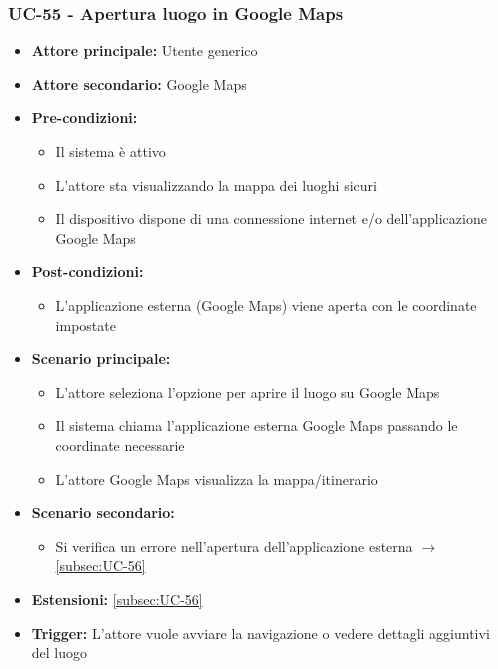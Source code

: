 \documentclass[a4paper,12pt]{article}
\begin{document}
\subsubsection{UC-55 - Apertura luogo in Google Maps} \label{subsec:UC-55}
\begin{itemize}
    \item \textbf{Attore principale:} Utente generico
    \item \textbf{Attore secondario:} Google Maps
    \item \textbf{Pre-condizioni:} 
    \begin{itemize}
        \item Il sistema è attivo
        \item L'attore sta visualizzando la mappa dei luoghi sicuri
        \item Il dispositivo dispone di una connessione internet e/o dell'applicazione Google Maps
    \end{itemize}
    \item \textbf{Post-condizioni:}
    \begin{itemize}
        \item L'applicazione esterna (Google Maps) viene aperta con le coordinate impostate
    \end{itemize}
    \item \textbf{Scenario principale:} 
    \begin{itemize}
        \item L'attore seleziona l'opzione per aprire il luogo su Google Maps
        \item Il sistema chiama l'applicazione esterna Google Maps passando le coordinate necessarie
        \item L'attore Google Maps visualizza la mappa/itinerario
    \end{itemize}
    \item \textbf{Scenario secondario:} 
    \begin{itemize}
         \item Si verifica un errore nell'apertura dell'applicazione esterna $\rightarrow$ \ref{subsec:UC-56}
    \end{itemize}
    \item \textbf{Estensioni:} \ref{subsec:UC-56}
    \item \textbf{Trigger:} L'attore vuole avviare la navigazione o vedere dettagli aggiuntivi del luogo
\end{itemize}
\end{document}
